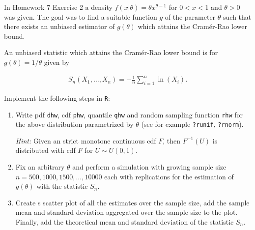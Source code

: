 
\begin{exercise}

In Homework 7 Exercise 2 a density $f(x|\theta) = \theta x^{\theta - 1}$
for $0 < x < 1$ and $\theta > 0$ was given. The goal was to find a suitable
function $g$ of the parameter $\theta$ such that there exists an unbiased
estimator of $g(\theta)$ which attains the Cramér-Rao lower bound.

An unbiased statistic which attains the Cramér-Rao lower bound is for
$g(\theta) = 1/\theta$ given by

\begin{align*}
  S_n(X_1,\dots,X_n) = - \frac{1}{n}\sum_{i=1}^n \ln(X_i).
\end{align*}

Implement the following steps in \texttt{R}:

\begin{enumerate}[label = (\alph*)]
  \item Write pdf \texttt{dhw}, cdf \texttt{phw}, quantile \texttt{qhw}
  and random sampling function \texttt{rhw} for the above distribution
  parametrized by $\theta$ (see for example \texttt{?runif}, \texttt{?rnorm}).

  \textit{Hint:} Given an strict monotone continuous cdf $F$, then $F^{-1}(U)$
  is distributed with cdf $F$ for $U \sim U(0,1)$.

  \item Fix an arbitrary $\theta$ and perform a simulation with growing
  sample size $n = 500, 1000, 1500, \dots, 10000$ each with replications
  for the estimation of $g(\theta)$ with the statistic $S_n$.
  
  \item Create s scatter plot of all the estimates over the sample size,
  add the sample mean and standard deviation aggregated over
  the sample size to the plot. Finally, add the theoretical mean and
  standard deviation of the statistic $S_n$.
\end{enumerate}

\end{exercise}


\begin{solution}

\phantom{}

\end{solution}

